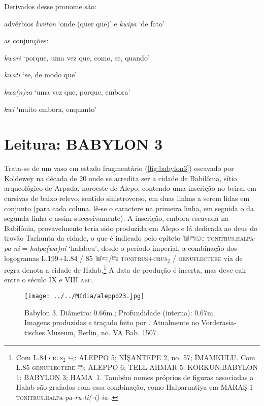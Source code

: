\noindent Derivados desse pronome são:
\begin{compactitem}
	\item advérbios \emph{kwitan} `onde (quer que)' e \emph{kwipa} `de fato'
	\item as conjunções:
	\begin{compactitem}
		\item \emph{kwari} `porque, uma vez que, como, se, quando'
		\item \emph{kwati} `se, de modo que'
		\item \emph{kwa{(n)}za} `uma vez que, porque, embora'
		\item \emph{kwi} `muito embora, enquanto'
	\end{compactitem}
\end{compactitem}


\clearpage

\section{Leitura: BABYLON 3}

Trata-se de um vaso em estado fragmentário (\autoref{fig:babylon3}) escavado por
Koldewey na década de 20 onde se acredita ser a cidade de Babilônia, sítio
arqueológico de Arpada, noroeste de Alepo, contendo uma inscrição no
beiral em cursivas de baixo relevo, sentido sinistroverso, em duas linhas a
serem lidas em conjunto (para cada coluna, lê-se o caractere na primeira linha,
em seguida o da segunda linha e assim sucessivamente).
A inscrição, embora escavada na Babilônia, provavelmente teria sido
produzida em Alepo e lá dedicada ao deus do trovão Tarhunta da cidade, o que é
indicado pelo epíteto 𔓢𔑞𔕸𔗐 \textsc{tonitrus.halpa}-\textit{pa-ni}
= \textit{halpa{(wa)}ni} `halabeu', desde o período imperial,
a combinação dos logogramas L.199+L.84 \slash{} 85 𔓢𔑝\slash{}𔑞
\textsc{tonitrus+crus$_2$ \slash{} genuflectere}
via de regra denota a cidade de Halab.\footnote{Com L.84
\textsc{crus}$_2$ 𔑝: ALEPPO 5; NİŞANTEPE 2, no. 57; İMAMKULU.\@
Com L.85 \textsc{genuflectere} 𔑞:  ALEPPO 6; TELL AHMAR 5;
KÖRKÜN;\@ BABYLON 1; BABYLON 3; \mbox{HAMA 1}.\@
Também nomes próprios de figuras associadas a Halab são grafados com essa
combinação, como Halparuntiya em
MARAŞ 1 \textsc{tonitrus.halpa}-\textit{pa-ru-ti{(-i)}-ia-}.
}
A data de produção é incerta, mas deve cair entre o século IX e VIII
\textsc{aec}.

\vfill

\begin{figure}[!htb]
	\texttt{[image: ../../Mídia/aleppo23.jpg]}
	\caption{
		Babylon 3. Diâmetro: 0.66m.; Profundidade
		(interna): 0.67m. Imagens produzidas e traçado feito por
		\citet[\emph{plate} 212]{CHLI13}. Atualmente no
		\foreignlanguage{german}{Vorderasiatisches Museum}, Berlin,
		no. VA Bab. 1507.
	}\label{fig:babylon3}
\end{figure}

